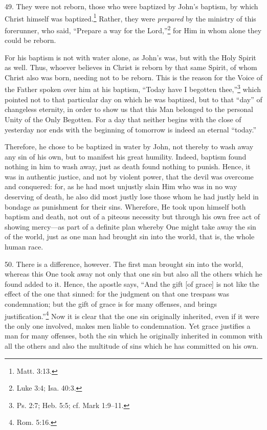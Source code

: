 49. They were not reborn, those who were baptized by John's baptism, by which Christ himself was baptized.\footnote{Matt. 3:13.} Rather, they were \emph{prepared} by the ministry of this forerunner, who said, ``Prepare a way for the Lord,''\footnote{Luke 3:4; Isa. 40:3.} for Him in whom alone they could be reborn.

For his baptism is not with water alone, as John's was, but with the Holy Spirit as well. Thus, whoever believes in Christ is reborn by that same Spirit, of whom Christ also was born, needing not to be reborn. This is the reason for the Voice of the Father spoken over him at his baptism, ``Today have I begotten thee,''\footnote{Ps. 2:7; Heb. 5:5; cf. Mark 1:9–11.} which pointed not to that particular day on which he was baptized, but to that ``day'' of changeless eternity, in order to show us that this Man belonged to the personal Unity of the Only Begotten. For a day that neither begins with the close of yesterday nor ends with the beginning of tomorrow is indeed an eternal ``today.''

Therefore, he chose to be baptized in water by John, not thereby to wash away any sin of his own, but to manifest his great humility. Indeed, baptism found nothing in him to wash away, just as death found nothing to punish. Hence, it was in authentic justice, and not by violent power, that the devil was overcome and conquered: for, as he had most unjustly slain Him who was in no way deserving of death, he also did most justly lose those whom he had justly held in bondage as punishment for their sins. Wherefore, He took upon himself both baptism and death, not out of a piteous necessity but through his own free act of showing mercy—as part of a definite plan whereby One might take away the sin of the world, just as one man had brought sin into the world, that is, the whole human race.

50. There is a difference, however. The first man brought sin into the world, whereas this One took away not only that one sin but also all the others which he found added to it. Hence, the apostle says, ``And the gift [of grace] is not like the effect of the one that sinned: for the judgment on that one trespass was condemnation; but the gift of grace is for many offenses, and brings justification.''\footnote{Rom. 5:16.} Now it is clear that the one sin originally inherited, even if it were the only one involved, makes men liable to condemnation. Yet grace justifies a man for many offenses, both the sin which he originally inherited in common with all the others and also the multitude of sins which he has committed on his own.

